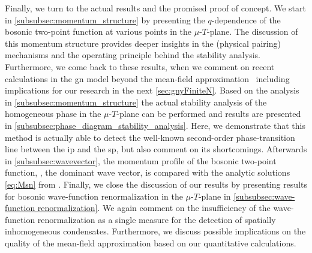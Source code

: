 Finally, we turn to the actual results and the promised proof of concept.
We start in \cref{subsubsec:momentum_structure} by presenting the $q$-dependence of the bosonic two-point function at various points in the $\mu$-$T$-plane.
The discussion of this momentum structure provides deeper insights in the (physical pairing) mechanisms and the operating principle behind the stability analysis.
Furthermore, we come back to these results, when we comment on recent calculations in the \gls{gn} model beyond the mean-field approximation~\cite{Pannullo:2019bfn,Pannullo:2019prx,Lenz:2020bxk,Lenz:2020cuv} including implications for our research in the next \cref{sec:gnyFiniteN}.
Based on the analysis in  \cref{subsubsec:momentum_structure} the actual stability analysis of the homogeneous phase in the $\mu$-$T$-plane can be performed and results are presented in \cref{subsubsec:phase_diagram_stability_analysis}.
Here, we demonstrate that this method is actually able to detect the well-known second-order phase-transition line between the \gls{ip} and the \gls{sp}, but also comment on its shortcomings.
Afterwards in \cref{subsubsec:wavevector}, the momentum profile of the bosonic two-point function, \ie{}, the dominant wave vector, is compared with the analytic solutions \eqref{eq:Msn} from .
Finally, we close the discussion of our results by presenting results for bosonic wave-function renormalization in the $\mu$-$T$-plane in \cref{subsubsec:wave-function renormalization}.
We again comment on the insufficiency of the wave-function renormalization as a single measure for the detection of spatially inhomogeneous condensates. Furthermore, we discuss possible implications on the quality of the mean-field approximation based on our quantitative calculations.

